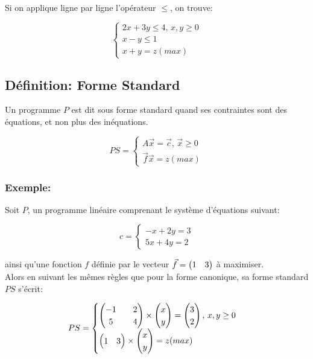 \documentclass[a4paper, 11pt]{article}
\begin{document}
Si on applique ligne par ligne l'opérateur $\le$, on trouve:

\[
    \begin{cases}
      2x + 3y \le 4 \text{, }x, y \ge 0 \\
      x - y \le 1 \\
      x + y = z (max)
    \end{cases}
\]

\newpage
\subsection{Définition: Forme Standard}
Un programme $P$ est dit sous forme standard quand ses contraintes sont des équations, et non plus des inéquations.

\[ PS =
  \begin{cases}
    A\vec{x} = \vec{c}\text{, } \vec{x} \ge 0 \\
    \vec{f}\vec{x} = z (max)
  \end{cases}
\]

\subsubsection{Exemple:}

Soit $P$, un programme linéaire comprenant le système d'équations suivant:

\[ c=
  \begin{cases}
    -x + 2y = 3 \\
    5x + 4y = 2
  \end{cases}
\]

ainsi qu'une fonction $f$ définie par le vecteur $\vec{f} = \begin{pmatrix} 1 & 3 \end{pmatrix}$ à maximiser. \\

Alors en suivant les mêmes règles que pour la forme canonique, sa forme standard $PS$ s'écrit:

\[
  \begin{aligned}
    PS =
    \begin{cases}
      \begin{pmatrix}
        -1 &&  2 \\
         5 &&  4 \\
      \end{pmatrix}
      \times \begin{pmatrix} x \\ y \end{pmatrix} = \begin{pmatrix} 3 \\ 2 \end{pmatrix}\text{, }x, y \ge 0\\
      
      \begin{pmatrix} 1 & 3 \end{pmatrix} \times \begin{pmatrix} x \\ y \end{pmatrix} = z (max)
    \end{cases}
  \end{aligned}
\]
\end{document}
